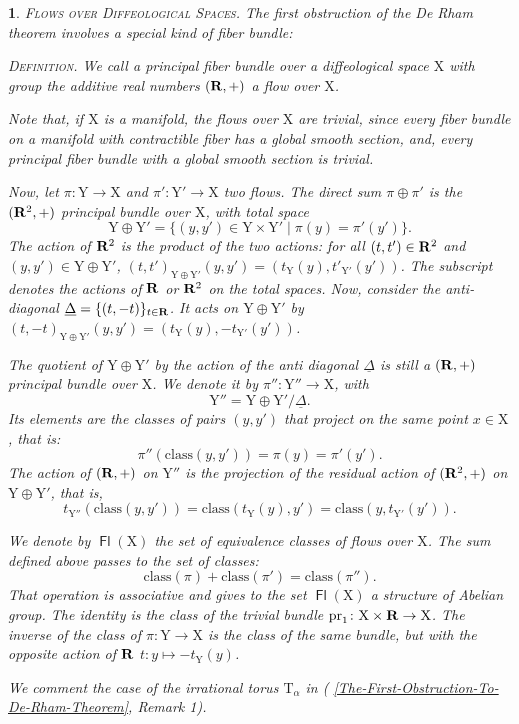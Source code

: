 \documentclass[12pt,reqno]{amsart}
\theoremstyle{article}
\newtheorem{article}{}
\def\artlabel[#1]{\textsc{#1}.}
\newcommand{\xart}[2]{(\text{\textsection} \ref{#1}, #2)}
\def \T{\mathrm T}
\def \X{\mathrm X}
\def \Y{\mathrm Y}
\newcommand{\RR}{{\bf R}}
\newcommand{\class}{\mathrm{class}}
\DeclareMathOperator{\Fl}{\mathsf{Fl}}
\newcommand{\pr}{{\rm pr}}
\newcommand{\ul}{\underline}
\begin{document}
  \begin{article}\artlabel[Flows over Diffeological Spaces]
    The first obstruction of the De Rham theorem involves a special kind of fiber bundle:
    
    \textsc{Definition.} {\it We call a principal fiber bundle over a diffeological space $\X$ with group the additive real numbers $(\RR, +)$ a \emph{flow} over $\X$.}
    
    Note that,
    if $\X$ is a manifold,
    the flows over $\X$ are trivial,
    since every fiber bundle on a manifold with contractible fiber has a global smooth section,
    and,
    every principal fiber bundle with a global smooth section is trivial.
    
    Now,
    let $\pi \colon \Y \to \X$ and $\pi' \colon \Y' \to \X$ two flows.
    The direct sum $\pi \oplus \pi'$ is the $(\RR^2,+)$ principal bundle over $\X$,
    with total space
    $$
    \Y \oplus \Y' = \{ (y,y') \in \Y \times \Y' \mid \pi(y) = \pi'(y') \}.
    $$
    The action of $\RR^2$ is the product of the two actions:
    for all $(t,t') \in \RR^2$ and $(y,y') \in \Y \oplus \Y'$,
    $(t,t')_{\Y \oplus \Y'}(y,y') = (t_\Y(y),t'_{\Y'}(y'))$.
    The subscript denotes the actions of $\RR$ or $\RR^2$ on the total spaces.
    Now,
    consider the anti-diagonal $\ul\Delta = \{(t,-t)\}_{t \in \RR}$.
    It acts on $\Y \oplus \Y'$ by $(t,-t)_{\Y \oplus \Y'}(y,y') = (t_\Y(y),-t_{\Y'}(y'))$.
    
    The quotient of  $\Y \oplus \Y'$ by the action of the anti diagonal $\ul\Delta$ is still a $(\RR,+)$ principal bundle over $\X$.
    We denote it by $\pi'' \colon \Y'' \to \X$,
    with
    $$
    \Y'' = \Y \oplus \Y' / \ul\Delta.
    $$
    Its elements are the classes of pairs $(y,y')$ that project on the same point $x \in \X$,
    that is:
    $$
    \pi''(\class(y,y')) = \pi(y) = \pi'(y').
    $$
    The action of $(\RR,+)$ on $\Y''$ is the projection of the residual action of $(\RR^2,+)$ on $\Y \oplus \Y'$,
    that is,
    $$
    t_{\Y''}(\class(y,y')) = \class(t_\Y(y),y') = \class(y,t_{\Y'}(y')).
    $$
    
    We denote by $\Fl(\X)$ the set of equivalence classes of flows over $\X$.
    The sum defined above passes to the set of classes:
    $$
    \class(\pi) + \class(\pi') = \class(\pi'').
    $$
    That operation is associative and gives to the set $\Fl(\X)$ a structure of Abelian group.
    The identity is the class of the trivial bundle $\pr_1 \colon \X \times \RR \to \X$.
    The inverse of the class of $\pi \colon \Y \to \X$ is the class of the same bundle,
    but with the opposite action of $\RR$ $t \colon y \mapsto {-t}_\Y(y)$.
    
    We comment the case of the irrational torus $\T_\alpha$ in \xart{The-First-Obstruction-To-De-Rham-Theorem}{Remark 1}.
  \end{article} %
  
\end{document}

